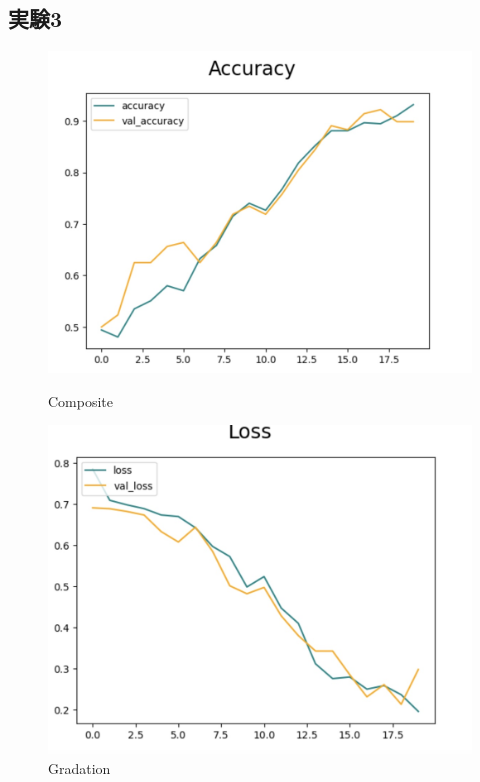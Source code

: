 \documentclass[a4paper, 11pt, titlepage]{jsarticle}
\begin{document}
\subsection{実験3}
\begin{figure}[htbp]
  \begin{minipage}[b]{0.45\linewidth}
    \centering
    \includegraphics[keepaspectratio, scale=0.161]{ex3_acc.jpg}
    \caption{Composite}
  \end{minipage}
  \begin{minipage}[b]{0.45\linewidth}
    \centering
    \includegraphics[keepaspectratio, scale=0.161]{ex3_loss.jpg}
    \caption{Gradation}
  \end{minipage}
\end{figure}
\end{document}
